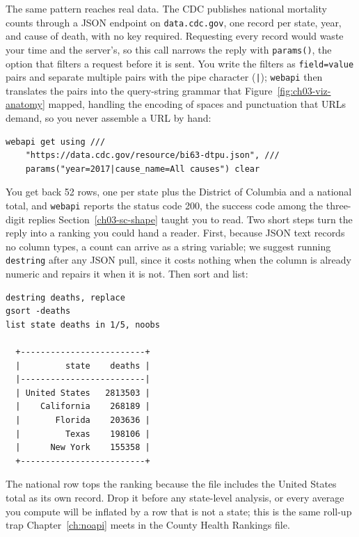 \documentclass[
    a4paper,
    fontsize=10pt,
    twoside=true,
    numbers=noenddot,
]{kaobook}
\begin{document}
The same pattern reaches real data. The CDC publishes national mortality counts through a JSON endpoint on \texttt{data.cdc.gov}, one record per state, year, and cause of death, with no key required. Requesting every record would waste your time and the server's, so this call narrows the reply with \texttt{params()}, the option that filters a request before it is sent. You write the filters as \texttt{field=value} pairs and separate multiple pairs with the pipe character (\texttt{|}); \texttt{webapi} then translates the pairs into the query-string grammar that Figure~\ref{fig:ch03-viz-anatomy} mapped, handling the encoding of spaces and punctuation that URLs demand, so you never assemble a URL by hand:
\par
{\footnotesize
\begin{verbatim}
webapi get using ///
    "https://data.cdc.gov/resource/bi63-dtpu.json", ///
    params("year=2017|cause_name=All causes") clear
\end{verbatim}
}
You get back 52 rows, one per state plus the District of Columbia and a national total, and \texttt{webapi} reports the status code 200, the success code among the three-digit replies Section~\ref{ch03-sc-shape} taught you to read. Two short steps turn the reply into a ranking you could hand a reader. First, because JSON text records no column types, a count can arrive as a string variable; we suggest running \texttt{destring} after any JSON pull, since it costs nothing when the column is already numeric and repairs it when it is not. Then sort and list:
\par
{\footnotesize
\begin{verbatim}
destring deaths, replace
gsort -deaths
list state deaths in 1/5, noobs

  +-------------------------+
  |         state    deaths |
  |-------------------------|
  | United States   2813503 |
  |    California    268189 |
  |       Florida    203636 |
  |         Texas    198106 |
  |      New York    155358 |
  +-------------------------+
\end{verbatim}
}
The national row tops the ranking because the file includes the United States total as its own record. Drop it before any state-level analysis, or every average you compute will be inflated by a row that is not a state; this is the same roll-up trap Chapter~\ref{ch:noapi} meets in the County Health Rankings file.
\end{document}
